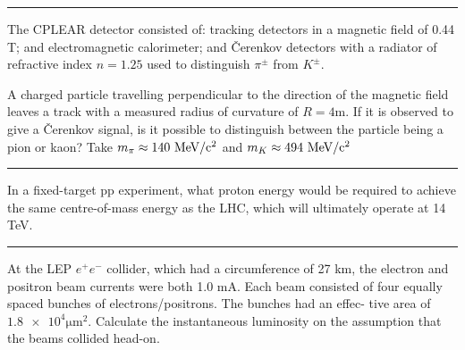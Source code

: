 \begin{solution}

\end{solution} 
\noindent\rule{7in}{1.5pt}


\begin{problem}{1.9}
The CPLEAR detector consisted of: tracking detectors in a magnetic field of 0.44 T; and electromagnetic calorimeter;
and Čerenkov detectors with a radiator of refractive index $n=1.25$ used to distinguish $\pi^\pm$ from $K^\pm$.

A charged particle travelling perpendicular to the direction of the magnetic field leaves a track with a
measured radius of curvature of $R=4$m. If it is observed to give a Čerenkov signal, is it 
possible to distinguish between the particle being a pion or kaon? Take $m_\pi \approx 140 \text{ MeV} /\text{c}^2$ and $m_K \approx 494 \text{ MeV} /\text{c}^2$ 
\end{problem}
\begin{solution}

\end{solution}

\noindent\rule{7in}{1.5pt}


\begin{problem}{1.10}
In a fixed-target pp experiment, what proton energy would be required to achieve the same centre-of-mass energy as the LHC, which will ultimately operate at 14 TeV.
\end{problem}
\begin{solution}
    
\end{solution} 
\noindent\rule{7in}{1.5pt}
    

\begin{problem}{1.11}
At the LEP $e^+e^-$ collider, which had a circumference of 27 km, the electron and positron beam currents were both 1.0 mA. Each beam consisted of four equally spaced bunches of electrons/positrons. The bunches had an effec- tive area of $\num{1.8e4}\unit{\micro\metre^2}$.
Calculate the instantaneous luminosity on the assumption that the beams collided head-on.
\end{problem}
\begin{solution}

\end{solution}